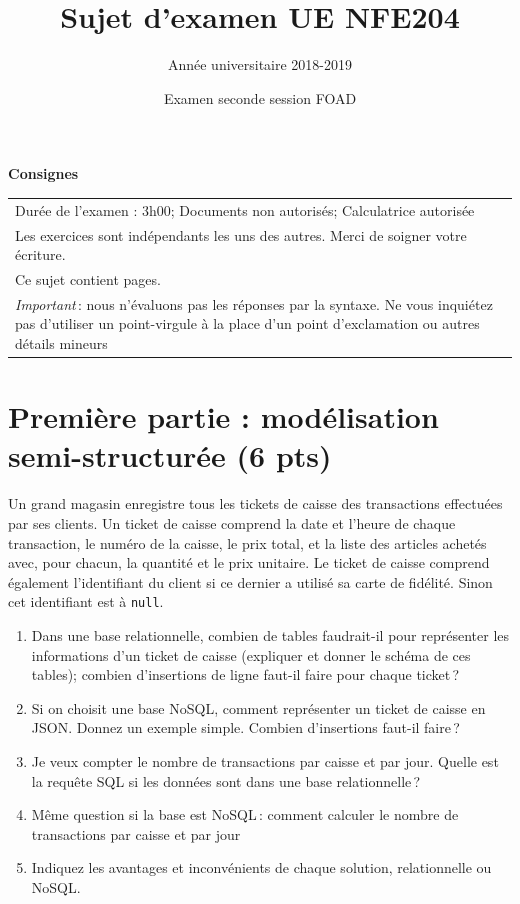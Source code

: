 \documentclass[11pt,a4paper]{article}
\begin{document}
\title{Sujet d'examen UE NFE204}
\author{Année universitaire 2018-2019}
\date{Examen seconde session FOAD}

\maketitle

\begin{center}
{\bf \Large Consignes}\\
\begin{tabular}{| p{15cm} |}
\hline
Dur\'ee de l'examen : 3h00; Documents non autoris\'es;  Calculatrice autoris\'ee\\

Les exercices sont indépendants les uns des autres. Merci de soigner votre écriture.\\
Ce sujet contient \pageref{LastPage} pages.\\

\textit{Important}\,: nous n'évaluons pas les réponses par la syntaxe. Ne vous
inquiétez pas d'utiliser un point-virgule à la place d'un point d'exclamation ou
autres détails mineurs
\\
\hline
\end{tabular}
\end{center}


\section*{Première partie : modélisation semi-structurée (6 pts)}

Un grand magasin enregistre tous les tickets de caisse des transactions effectuées par ses clients.
Un ticket de caisse comprend la date et l'heure de chaque transaction, le numéro de la caisse, le prix total,
et la liste des articles achetés avec, pour chacun, la quantité et le prix unitaire.  Le ticket de caisse comprend également
l'identifiant du client si ce dernier a utilisé sa carte de fidélité. Sinon cet identifiant
est à \texttt{null}.


\begin{enumerate}
  \item Dans une base relationnelle, combien de tables faudrait-il pour représenter 
         les informations d'un ticket de caisse (expliquer et donner le schéma de ces tables); combien d'insertions de ligne
             faut-il faire pour chaque ticket\,?
    \item Si on choisit une base NoSQL, comment représenter un ticket de caisse en JSON.
        Donnez un exemple simple. Combien d'insertions faut-il faire\,?
   \item Je veux compter le nombre de transactions par caisse et par jour.  Quelle est la requête SQL si les données
       sont dans une base relationnelle\,?
    \item Même question si la base est NoSQL\,: comment calculer le nombre de transactions par caisse et par jour
    \item Indiquez les avantages et inconvénients de chaque solution, relationnelle ou NoSQL.
 \end{enumerate}
\end{document}
